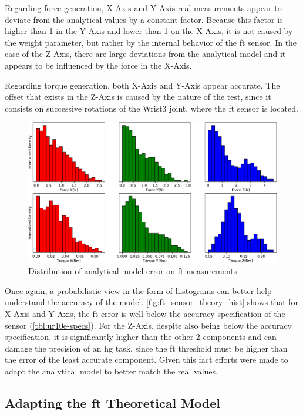 \par Regarding force generation, X-Axis and Y-Axis real measurements appear to deviate from the analytical values by a constant factor. Because this factor is higher than 1 in the Y-Axis and lower than 1 on the X-Axis, it is not caused by the weight parameter, but rather by the internal behavior of the \ac{ft} sensor. In the case of the Z-Axis, there are large deviations from the analytical model and it appears to be influenced by the force in the X-Axis.
\par Regarding torque generation, both X-Axis and Y-Axis appear accurate. The offset that exists in the Z-Axis is caused by the nature of the test, since it consists on successive rotations of the Wrist3 joint, where the \ac{ft} sensor is located.

\begin{figure}[h]
    \centering
    \includegraphics[width=0.8\linewidth]{figs/chp3/ft_sensor_theory_hist.pdf}
    \caption{Distribution of analytical model error on \ac{ft} measurements}
    \label{fig:ft_sensor_theory_hist}
\end{figure}

\par Once again, a probabilistic view in the form of histograms can better help understand the accuracy of the model. \autoref{fig:ft_sensor_theory_hist} shows that for X-Axis and Y-Axis, the \ac{ft} error is well below the accuracy specification of the sensor (\autoref{tbl:ur10e-specs}). For the Z-Axis, despite also being below the accuracy specification, it is significantly higher than the other 2 components and can damage the precision of an \ac{hg} task, since the \ac{ft} threshold must be higher than the error of the least accurate component. Given this fact efforts were made to adapt the analytical model to better match the real values. 

\subsection{Adapting the \ac{ft} Theoretical Model}

